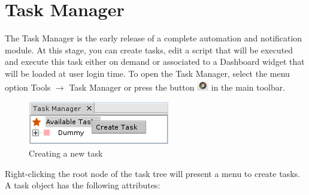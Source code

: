 \documentclass[a4paper]{article}
\begin{document}
	\clearpage
	\section{Task Manager} \label{sec:task_manager}
		The Task Manager is the early release of a complete automation and notification module. At this stage, you can create tasks, edit a script that will be executed and execute this task either on demand or associated to a Dashboard widget that will be loaded at user login time. To open the Task Manager, select the menu option Tools $\rightarrow$ Task Manager or press the button \includegraphics[width=0.5cm]{img/icon_task_manager.png} in the main toolbar.\\
		
		\begin{figure}[h!]
			\centering
			\includegraphics[width=0.3\linewidth]{img/task_manager_create_task.png}
			\caption{Creating a new task}
			\label{fig:task_manager_create_task}
		\end{figure}
		
		Right-clicking the root node of the task tree will present a menu to create tasks. A task object has the following attributes:
		
\end{document}
